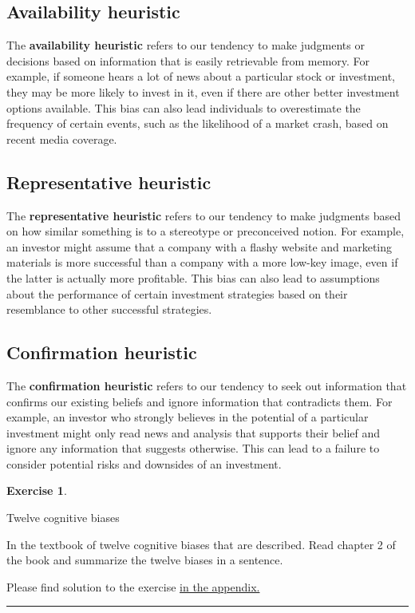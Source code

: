 \documentclass[
  12pt,
  oneside]{book}
\theoremstyle{definition}
\theoremstyle{definition}
\theoremstyle{definition}
\newtheorem{exercise}{Exercise}[chapter]
\theoremstyle{definition}
\theoremstyle{remark}
\begin{document}
\hypertarget{availability-heuristic}{%
\subsection{Availability heuristic}\label{availability-heuristic}}

The \textbf{availability heuristic} refers to our tendency to make judgments or decisions based on information that is easily retrievable from memory. For example, if someone hears a lot of news about a particular stock or investment, they may be more likely to invest in it, even if there are other better investment options available. This bias can also lead individuals to overestimate the frequency of certain events, such as the likelihood of a market crash, based on recent media coverage.

\hypertarget{representative-heuristic}{%
\subsection{Representative heuristic}\label{representative-heuristic}}

The \textbf{representative heuristic} refers to our tendency to make judgments based on how similar something is to a stereotype or preconceived notion. For example, an investor might assume that a company with a flashy website and marketing materials is more successful than a company with a more low-key image, even if the latter is actually more profitable. This bias can also lead to assumptions about the performance of certain investment strategies based on their resemblance to other successful strategies.

\hypertarget{confirmation-heuristic}{%
\subsection{Confirmation heuristic}\label{confirmation-heuristic}}

The \textbf{confirmation heuristic} refers to our tendency to seek out information that confirms our existing beliefs and ignore information that contradicts them. For example, an investor who strongly believes in the potential of a particular investment might only read news and analysis that supports their belief and ignore any information that suggests otherwise. This can lead to a failure to consider potential risks and downsides of an investment.

\begin{exercise}
\protect\hypertarget{exr:bazermanbias}{}\label{exr:bazermanbias}

Twelve cognitive biases

In the textbook of \citet{Bazerman2017Judgement} twelve cognitive biases that are described. Read chapter 2 of the book and summarize the twelve biases in a sentence.

Please find solution to the exercise \protect\hyperlink{sol:bazermanbias}{in the appendix.}

\begin{center}\rule{0.5\linewidth}{0.5pt}\end{center}

\end{exercise}
\end{document}
